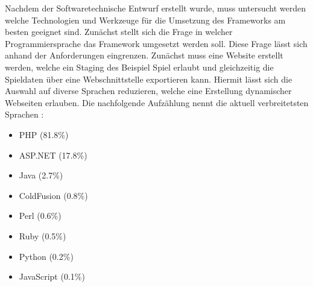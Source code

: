 Nachdem der Softwaretechnische Entwurf erstellt wurde, muss untersucht werden welche Technologien und Werkzeuge für die Umsetzung des Frameworks am besten geeignet sind.
Zunächst stellt sich die Frage in welcher Programmiersprache das Framework umgesetzt werden soll. Diese Frage lässt sich anhand der Anforderungen eingrenzen. Zunächst muss eine Website erstellt werden, welche ein Staging des Beispiel Spiel erlaubt und gleichzeitig die Spieldaten über eine Webschnittstelle exportieren kann. Hiermit lässt sich die Auswahl auf diverse Sprachen reduzieren, welche eine Erstellung dynamischer Webseiten erlauben.
Die nachfolgende Aufzählung nennt die aktuell verbreitetsten Sprachen \cite{WWWtechs.2014, Deitel.2008}:

\begin{itemize}
\item PHP (81.8\%)
\item ASP.NET (17.8\%)
\item Java (2.7\%)
\item ColdFusion (0.8\%)
\item Perl (0.6\%)
\item Ruby (0.5\%)
\item Python (0.2\%)
\item JavaScript (0.1\%)
\end{itemize}


